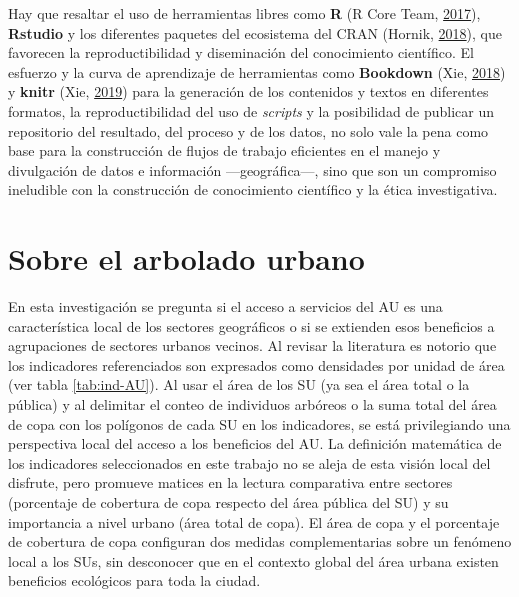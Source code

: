 \documentclass[12pt,a4paper,oneside, openany]{book}
\theoremstyle{definition}
\theoremstyle{definition}
\theoremstyle{definition}
\theoremstyle{remark}
\begin{document}
Hay que resaltar el uso de herramientas libres como \textbf{R} (R Core
Team, \protect\hyperlink{ref-R-base}{2017}), \textbf{Rstudio} y los
diferentes paquetes del ecosistema del CRAN (Hornik,
\protect\hyperlink{ref-R-cran}{2018}), que favorecen la
reproductibilidad y diseminación del conocimiento científico. El
esfuerzo y la curva de aprendizaje de herramientas como
\textbf{Bookdown} (Xie, \protect\hyperlink{ref-R-bookdown}{2018}) y
\textbf{knitr} (Xie, \protect\hyperlink{ref-R-knitr}{2019}) para la
generación de los contenidos y textos en diferentes formatos, la
reproductibilidad del uso de \emph{scripts} y la posibilidad de publicar
un repositorio del resultado, del proceso y de los datos, no solo vale
la pena como base para la construcción de flujos de trabajo eficientes
en el manejo y divulgación de datos e información ---geográfica---, sino
que son un compromiso ineludible con la construcción de conocimiento
científico y la ética investigativa.

\section{Sobre el arbolado urbano}\label{sobre-el-arbolado-urbano}

En esta investigación se pregunta si el acceso a servicios del AU es una
característica local de los sectores geográficos o si se extienden esos
beneficios a agrupaciones de sectores urbanos vecinos. Al revisar la
literatura es notorio que los indicadores referenciados son expresados
como densidades por unidad de área (ver tabla \ref{tab:ind-AU}). Al usar
el área de los SU (ya sea el área total o la pública) y al delimitar el
conteo de individuos arbóreos o la suma total del área de copa con los
polígonos de cada SU en los indicadores, se está privilegiando una
perspectiva local del acceso a los beneficios del AU. La definición
matemática de los indicadores seleccionados en este trabajo no se aleja
de esta visión local del disfrute, pero promueve matices en la lectura
comparativa entre sectores (porcentaje de cobertura de copa respecto del
área pública del SU) y su importancia a nivel urbano (área total de
copa). El área de copa y el porcentaje de cobertura de copa configuran
dos medidas complementarias sobre un fenómeno local a los SUs, sin
desconocer que en el contexto global del área urbana existen beneficios
ecológicos para toda la ciudad.
\end{document}
